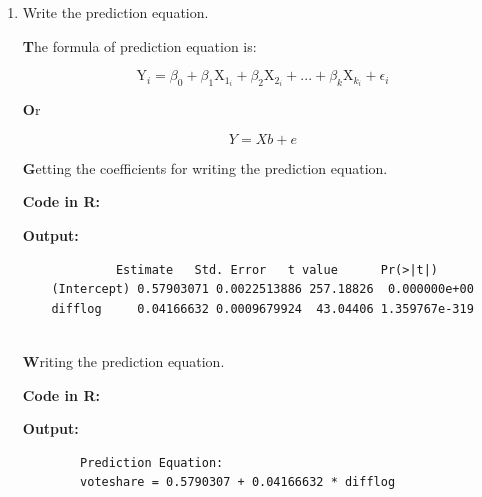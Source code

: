 \documentclass[12pt,letterpaper]{article}
\begin{document}
\begin{enumerate}
		\noindent \textbf After execution of the regression model I can save the residuals of the model in a separate object by using residuals(). \vspace{0.5cm}
		
		\noindent \textbf{Code in R:}
		  
		\vspace{.25cm}
		
		\noindent \textbf{Output: }
		\begin{verbatim}
1             2             3             
-0.0004227622 -0.0316840149 -0.0045514943  
4             5             6
0.0386688767  0.0355287965  0.0322832521 			
		\end{verbatim}  
		\vspace{.25cm}
		
		
		\item Write the prediction equation. \vspace{0.5cm}
		
		\noindent \textbf The formula of prediction equation is: \vspace{0.5cm}
		
$$ \text{Y}_i = \beta_0 + \beta_1 \text{X}_1_i + \beta_2 \text{X}_2_i + ... + \beta_k \text{X}_k_i +\epsilon_i $$
		
			\noindent \textbf Or \vspace{0.5cm}
			
			$$Y = Xb + e $$
		
		\noindent \textbf Getting the coefficients for writing the prediction equation. 
		\vspace{0.5cm}
		
		\noindent \textbf{Code in R:}
		  
		\vspace{.25cm}
		
		\noindent \textbf{Output: }
		\begin{verbatim}
             Estimate   Std. Error   t value      Pr(>|t|)
	(Intercept) 0.57903071 0.0022513886 257.18826  0.000000e+00
	difflog     0.04166632 0.0009679924  43.04406 1.359767e-319
			
		\end{verbatim}  
		\vspace{.25cm}
		
		\noindent \textbf Writing the prediction equation. 
		\vspace{0.5cm}	
		
		\noindent \textbf{Code in R:}
		  
		\vspace{.25cm}
		
		\noindent \textbf{Output: }
		\begin{verbatim}
		Prediction Equation: 
		voteshare = 0.5790307 + 0.04166632 * difflog
		\end{verbatim}  
		\vspace{1 cm}
		\vspace{1 cm}
		
		
		
	\end{enumerate}
	
\end{document}
